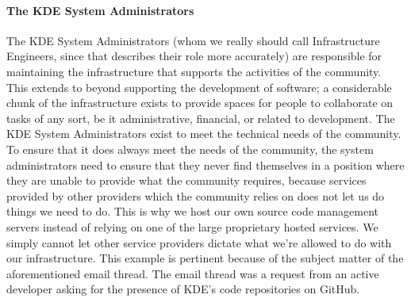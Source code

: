 \paragraph{The KDE System Administrators}
The KDE System Administrators (whom we really should call Infrastructure Engineers, since that describes their role more accurately) are responsible for maintaining the infrastructure that supports the activities of the community. This extends to beyond supporting the development of software; a considerable chunk of the infrastructure exists to provide spaces for people to collaborate on tasks of any sort, be it administrative, financial, or related to development. The KDE System Administrators exist to meet the technical needs of the community.
To ensure that it does always meet the needs of the community, the system administrators need to ensure that they never find themselves in a position where they are unable to provide what the community requires, because services provided by other providers which the community relies on does not let us do things we need to do. This is why we host our own source code management servers instead of relying on one of the large proprietary hosted services. We simply cannot let other service providers dictate what we’re allowed to do with our infrastructure.
This example is pertinent because of the subject matter of the aforementioned email thread. The email thread was a request from an active developer asking for the presence of KDE’s code repositories on GitHub.

